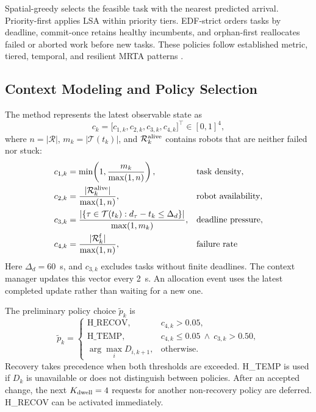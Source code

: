 \documentclass[10pt,letterpaper,onecolumn]{IEEEtran}
\begin{document}


Spatial-greedy selects the feasible task with the nearest predicted arrival.
Priority-first applies LSA within priority tiers. EDF-strict orders tasks by
deadline, commit-once retains healthy incumbents, and orphan-first reallocates
failed or aborted work before new tasks. These policies follow established
metric, tiered, temporal, and resilient MRTA patterns
\cite{khamis2015multi,choi2009consensus,dutta2019task}.

\subsection{Context Modeling and Policy Selection}
\label{sec:context}

The method represents the latest observable state as
\begin{equation}
  c_k=\big[c_{1,k},c_{2,k},c_{3,k},c_{4,k}\big]^\top\in[0,1]^4 ,
  \label{eq:context-vector}
\end{equation}
where $n=|\mathcal R|$, $m_k=|\mathcal T(t_k)|$, and
$\mathcal R^{\rm alive}_k$ contains robots that are neither failed nor stuck:
\begin{align}
 c_{1,k} &= \min\!\left(1,\frac{m_k}{\max(1,n)}\right),
 &&\text{task density},\label{eq:ctx-start}\\
 c_{2,k} &= \frac{|\mathcal R^{\rm alive}_k|}{\max(1,n)},
 &&\text{robot availability},\\
 c_{3,k} &= \frac{\left|\left\{\tau\in\mathcal T(t_k):
                d_\tau-t_k\leq\Delta_d\right\}\right|}{\max(1,m_k)},
 &&\text{deadline pressure},\\
 c_{4,k} &= \frac{|\mathcal R^{\rm f}_k|}{\max(1,n)},
 &&\text{failure rate}\label{eq:ctx-end}
\end{align}
Here $\Delta_d=60$~s, and $c_{3,k}$ excludes tasks without finite deadlines.
The context manager updates this vector every 2~s. An allocation event uses the
latest completed update rather than waiting for a new one.

\label{sec:dispatch}

The preliminary policy choice $\tilde p_k$ is
\begin{equation}
\tilde p_k=
\begin{cases}
\mathrm{H\_RECOV}, & c_{4,k}>0.05,\\
\mathrm{H\_TEMP}, & c_{4,k}\leq0.05\ \wedge\ c_{3,k}>0.50,\\
\arg\max_i D_{i,k+1}, & \text{otherwise}.
\end{cases}
\label{eq:dispatch}
\end{equation}
Recovery takes precedence when both thresholds are exceeded. H\_TEMP is used
if $D_k$ is unavailable or does not distinguish between policies. After an
accepted change, the next $K_{\rm dwell}=4$ requests for another non-recovery
policy are deferred. H\_RECOV can be activated immediately.
\end{document}

